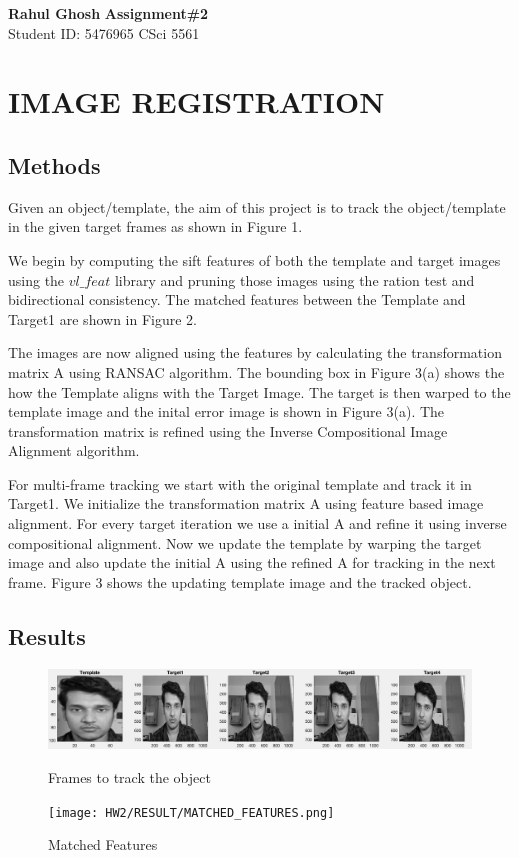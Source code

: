 \documentclass[letter, 10pt]{article}
\begin{document}
\noindent
\large \textbf{Rahul Ghosh} \hfill \textbf{Assignment\#2}\\
\normalsize Student ID: 5476965 \hfill CSci 5561\\

\section*{IMAGE REGISTRATION}
\subsection*{Methods}
Given an object/template, the aim of this project is to track the object/template in the given target frames as shown in Figure 1.

We begin by computing the sift features of both the template and target images using the $vl\_feat$ library and pruning those images using the ration test and bidirectional consistency. The matched features between the Template and Target1 are shown in Figure 2.

The images are now aligned using the features by calculating the transformation matrix A using RANSAC algorithm. The bounding box in Figure 3(a) shows the how the Template aligns with the Target Image. The target is then warped to the template image and the inital error image is shown in Figure 3(a). The transformation matrix is refined using the Inverse Compositional Image Alignment algorithm.

For multi-frame tracking we start with the original template and track it in Target1. We initialize the transformation matrix A using feature based image alignment. For every target iteration we use a initial A and refine it using inverse compositional alignment. Now we update the template by warping the target image and also update the initial A using the refined A for tracking in the next frame. Figure 3 shows the updating template image and the tracked object.

\subsection*{Results}
\begin{figure}[h]
        \centering
        \includegraphics[width=\textwidth]{HW2/RESULT/FRAMES.png}
        \caption{Frames to track the object}
    \endminipage\hfill
        \centering
        \texttt{[image: HW2/RESULT/MATCHED\_FEATURES.png]}
        \caption{Matched Features}
    \endminipage\hfill
\end{figure}
\end{document}
